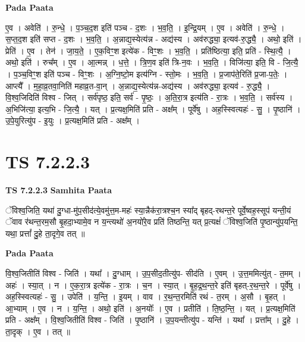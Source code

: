 \documentclass[17pt]{extarticle}
\begin{document}
\textbf{Pada Paata} \newline

ए॒व । अवेति॑ । रु॒न्धे॒ । प॒ञ्च॒द॒श इति॑ पञ्च - द॒शः । भ॒व॒ति॒ । इ॒न्द्रि॒यम् । ए॒व । अवेति॑ । रु॒न्धे॒ । स॒प्त॒द॒श इति॑ सप्त - द॒शः । भ॒व॒ति॒ । अ॒न्नाद्य॒स्येत्य॑न्न - अद्य॑स्य । अव॑रुद्ध्या॒ इत्यव॑-रु॒द्ध्यै॒ । अथो॒ इति॑ । प्रेति॑ । ए॒व । तेन॑ । जा॒य॒ते॒ । ए॒क॒विꣳ॒॒श इत्ये॑क - विꣳ॒॒शः । भ॒व॒ति॒ । प्रति॑ष्ठित्या॒ इति॒ प्रति॑ - स्थि॒त्यै॒ । अथो॒ इति॑ । रुच᳚म् । ए॒व । आ॒त्मन्न् । ध॒त्ते॒ । त्रि॒ण॒व इति॑ त्रि-न॒वः । भ॒व॒ति॒ । विजि॑त्या॒ इति॒ वि - जि॒त्यै॒ । प॒ञ्च॒विꣳ॒॒श इति॑ पञ्च - विꣳ॒॒शः । अ॒ग्नि॒ष्टो॒म इत्य॑ग्नि - स्तो॒मः । भ॒व॒ति॒ । प्र॒जाप॑ते॒रिति॑ प्र॒जा-प॒तेः॒ । आप्त्यै᳚ । म॒हा॒व्र॒तवा॒निति॑ महाव्र॒त-वा॒न् । अ॒न्नाद्य॒स्येत्य॑न्न-अद्य॑स्य । अव॑रुद्ध्या॒ इत्यव॑ - रु॒द्ध्यै॒ । वि॒श्व॒जिदिति॑ विश्व - जित् । सर्व॑पृष्ठ॒ इति॒ सर्व॑ - पृ॒ष्ठः॒ । अ॒ति॒रा॒त्र इत्य॑ति - रा॒त्रः । भ॒व॒ति॒ । सर्व॑स्य । अ॒भिजि॑त्या॒ इत्य॒भि - जि॒त्यै॒ । यत् । प्र॒त्यक्ष॒मिति॑ प्रति - अक्ष᳚म् । पूर्वे॑षु । अह॒स्स्वित्यहः॑ - सु॒ । पृ॒ष्ठानि॑ । उ॒पे॒युरित्यु॑प - इ॒युः । प्र॒त्यक्ष॒मिति॑ प्रति - अक्ष᳚म् ।  \newline




\section*{ TS 7.2.2.3 }

\textbf{TS 7.2.2.3 } \newline
\textbf{Samhita Paata} \newline

ॅविश्व॒जिति॒ यथा॑ दु॒ग्धा-मु॑प॒सीद॑त्ये॒वमु॑त्त॒म-महः॑ स्या॒न्नैक॑रा॒त्रश्च॒न स्या᳚द् बृहद्-रथन्त॒रे पूर्वे॒ष्वह॒स्सूप॑ यन्ती॒यं ॅवाव र॑थन्त॒रम॒सौ बृ॒हदा॒भ्यामे॒व न य॒न्त्यथो॑ अ॒नयो॑रे॒व प्रति॑ तिष्ठन्ति॒ यत् प्र॒त्यक्षं॑ ॅविश्व॒जिति॑ पृ॒ष्ठान्यु॑प॒यन्ति॒ यथा॒ प्रत्तां᳚ दु॒हे ता॒दृगे॒व तत् ॥ \newline

\textbf{Pada Paata} \newline

वि॒श्व॒जितीति॑ विश्व - जिति॑ । यथा᳚ । दु॒ग्धाम् । उ॒प॒सीद॒तीत्यु॑प- सीद॑ति । ए॒वम् । उ॒त्त॒ममित्यु॑त् - त॒मम् । अहः॑ । स्या॒त् । न । ए॒क॒रा॒त्र इत्ये॑क - रा॒त्रः । च॒न । स्या॒त् । बृ॒ह॒द्र॒थ॒न्त॒रे इति॑ बृहत्-र॒थ॒न्त॒रे । पूर्वे॑षु । अह॒स्स्वित्यहः॑ - सु॒ । उपेति॑ । य॒न्ति॒ । इ॒यम् । वाव । र॒थ॒न्त॒रमिति॑ रथं - त॒रम् । अ॒सौ । बृ॒हत् । आ॒भ्याम् । ए॒व । न । य॒न्ति॒ । अथो॒ इति॑ । अ॒नयोः᳚ । ए॒व । प्रतीति॑ । ति॒ष्ठ॒न्ति॒ । यत् । प्र॒त्यक्ष॒मिति॑ प्रति - अक्ष᳚म् । वि॒श्व॒जितीति॑ विश्व - जिति॑ । पृ॒ष्ठानि॑ । उ॒प॒यन्तीत्यु॑प - यन्ति॑ । यथा᳚ । प्रत्ता᳚म् । दु॒हे । ता॒दृक् । ए॒व । तत् ॥  \newline
\end{document}

